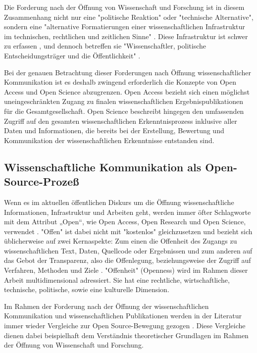 Die Forderung nach der Öffnung von Wissenschaft und Forschung ist in diesem Zusammenhang nicht nur eine "politische Reaktion" oder "technische Alternative", sondern eine "alternative Formatierungen einer wissenschaftlichen Infrastruktur im technischen, rechtlichen und zeitlichen Sinne" \cite{kelty_2004}. Diese Infrastruktur ist schwer zu erfassen \cite[:319]{bowker_2000_sorting}, und dennoch betreffen sie "Wissenschaftler, politische Entscheidungsträger und die Öffentlichkeit" \cite{Scheliga_2014}.

Bei der genauen Betrachtung dieser Forderungen nach Öffnung wissenschaftlicher Kommunikation ist es deshalb zwingend erforderlich die Konzepte von Open Access und Open Science abzugrenzen. Open Access bezieht sich einen möglichst uneingeschränkten Zugang zu finalen wissenschaftlichen Ergebnispublikationen für die Gesamtgesellschaft. Open Science beschreibt hingegen den umfassenden Zugriff auf den gesamten wissenschaftlichen Erkenntnisprozess inklusive aller Daten und Informationen, die bereits bei der Erstellung, Bewertung und Kommunikation der wissenschaftlichen Erkenntnisse entstanden sind.

\subsection{Wissenschaftliche Kommunikation als Open-Source-Prozeß}

Wenn es im aktuellen öffentlichen Diskurs um die Öffnung wissenschaftliche Informationen, Infrastruktur und Arbeiten geht, werden immer öfter Schlagworte mit dem Attribut „Open“, wie Open Access, Open Research und Open Science, verwendet \cite{bunz_2014} \cite{schulze_2013_open}. "Offen" ist dabei nicht mit "kostenlos" gleichzusetzen \cite{grand_2012_open} und bezieht sich üblicherweise auf zwei Kernaspekte: Zum einen die Offenheit des Zugangs zu wissenschaftlichen Text, Daten, Quellcode oder Ergebnissen und zum anderen auf das Gebot der Transparenz, also die Offenlegung, beziehungsweise der Zugriff auf Verfahren, Methoden und Ziele \cite{schulze_2013_open}. "Offenheit" (Openness) wird im Rahmen dieser Arbeit multidimensional adressiert. Sie hat eine rechtliche, wirtschaftliche, technische, politische, sowie eine kulturelle Dimension.

Im Rahmen der Forderung nach der Öffnung der wissenschaftlichen Kommunikation und wissenschaftlichen Publikationen werden in der Literatur immer wieder Vergleiche zur Open Source-Bewegung gezogen  \cite{cite:9} \cite{Peters_2014} \cite{RIN_2010_open_research} \cite[:423]{mantz_2007_open} \cite{cite:1}. Diese Vergleiche dienen dabei beispielhaft dem Verständnis theoretischer Grundlagen im Rahmen der Öffnung von Wissenschaft und Forschung.

